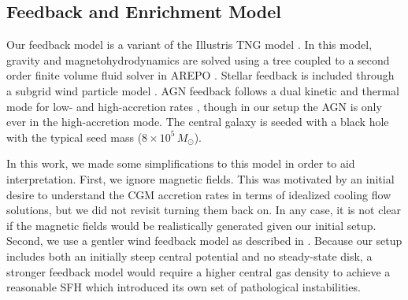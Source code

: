 \documentclass[twocolumn,linenumbers,trackchanges]{aastex631}
\newcommand{\Msun}{\ensuremath{M_{\odot}}}
\begin{document}
\subsection{Feedback and Enrichment Model}\label{ssec:gfm}
Our feedback model is a variant of the Illustris TNG model \citep{2013MNRAS.436.3031V,2017MNRAS.465.3291W,2018MNRAS.473.4077P}. In this model, gravity and magnetohydrodynamics are solved using a \citet{1986Natur.324..446B} tree coupled to a second order finite volume fluid solver in AREPO \citep{2010MNRAS.401..791S,2016MNRAS.455.1134P}. Stellar feedback is included through a subgrid wind particle model \citep{2003MNRAS.339..289S}. AGN feedback follows a dual kinetic and thermal mode for low- and high-accretion rates \citep{2017MNRAS.465.3291W}, though in our setup the AGN is only ever in the high-accretion mode. The central galaxy is seeded with a black hole with the typical seed mass ($8\times10^5\,\Msun$). 

In this work, we made some simplifications to this model in order to aid interpretation. First, we ignore magnetic fields. This was motivated by an initial desire to understand the CGM accretion rates in terms of idealized cooling flow solutions, but we did not revisit turning them back on. In any case, it is not clear if the magnetic fields would be realistically generated given our initial setup. Second, we use a gentler wind feedback model as described in \citet{2019MNRAS.489.4233M}. Because our setup includes both an initially steep central potential and no steady-state disk, a stronger feedback model would require a higher central gas density to achieve a reasonable SFH which introduced its own set of pathological instabilities.
\end{document}
